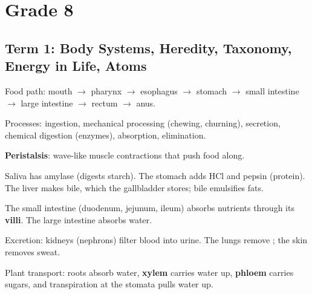 \section{Grade 8}
\resetcards
\begin{gradebody}

\subsection{Term 1: Body Systems, Heredity, Taxonomy, Energy in Life, Atoms}

\kf
\begin{keyfacts}
\item Food path: mouth $\rightarrow$ pharynx $\rightarrow$ esophagus $\rightarrow$ stomach $\rightarrow$ small intestine $\rightarrow$ large intestine $\rightarrow$ rectum $\rightarrow$ anus.
\item Processes: ingestion, mechanical processing (chewing, churning), secretion, chemical digestion (enzymes), absorption, elimination.
\item \textbf{Peristalsis}: wave-like muscle contractions that push food along.
\item Saliva has amylase (digests starch). The stomach adds HCl and pepsin (protein). The liver makes bile, which the gallbladder stores; bile emulsifies fats.
\item The small intestine (duodenum, jejunum, ileum) absorbs nutrients through its \textbf{villi}. The large intestine absorbs water.
\item Excretion: kidneys (nephrons) filter blood into urine. The lungs remove ; the skin removes sweat.
\item Plant transport: roots absorb water, \textbf{xylem} carries water up, \textbf{phloem} carries sugars, and transpiration at the stomata pulls water up.
\end{keyfacts}
\cards
{}

\end{gradebody}

